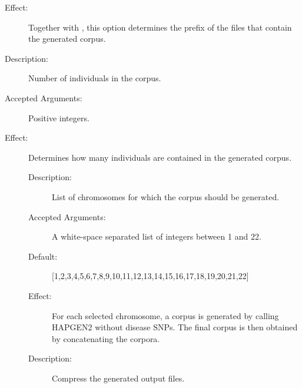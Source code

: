\documentclass[a4paper,10pt,english]{sphinxhowto}
\begin{document}
\begin{description}
\begin{description}
\begin{description}
\item[{Effect:}] \leavevmode
Together with , this option determines the prefix  of the files
that contain the generated corpus.

\end{description}

\item[{\sphinxcode{\sphinxupquote{-{-}inds INDS}}}] \leavevmode\begin{description}
\item[{Description:}] \leavevmode
Number of individuals in the corpus.

\item[{Accepted Arguments:}] \leavevmode
Positive integers.

\item[{Effect:}] \leavevmode
Determines how many individuals are contained in the generated corpus.

\end{description}

\end{description}

\item[{\sphinxstylestrong{Optional Arguments:}}] \leavevmode\begin{description}
\item[{}] \leavevmode\begin{description}
\item[{Description:}] \leavevmode
List of chromosomes for which the corpus should be generated.

\item[{Accepted Arguments:}] \leavevmode
A white-space separated list of integers between 1 and 22.

\item[{Default:}] \leavevmode
{[}1,2,3,4,5,6,7,8,9,10,11,12,13,14,15,16,17,18,19,20,21,22{]}

\item[{Effect:}] \leavevmode
For each selected chromosome, a corpus is generated by calling HAPGEN2 without disease SNPs.
The final corpus is then obtained by concatenating the corpora.

\end{description}

\item[{}] \leavevmode\begin{description}
\item[{Description:}] \leavevmode
Compress the generated output files.


\end{description}
\end{description}
\end{description}
\end{document}
